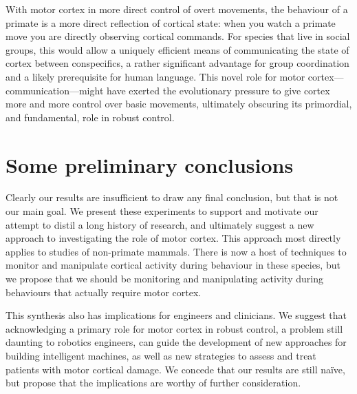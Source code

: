 With motor cortex in more direct control of overt movements, the behaviour of a primate is a more direct reflection of cortical state: when you watch a primate move you are directly observing cortical commands. For species that live in social groups, this would allow a uniquely efficient means of communicating the state of cortex between conspecifics, a rather significant advantage for group coordination and a likely prerequisite for human language. This novel role for motor cortex---communication---might have exerted the evolutionary pressure to give cortex more and more control over basic movements, ultimately obscuring its primordial, and fundamental, role in robust control.

\section{Some preliminary conclusions}

Clearly our results are insufficient to draw any final conclusion, but that is not our main goal. We present these experiments to support and motivate our attempt to distil a long history of research, and ultimately suggest a new approach to investigating the role of motor cortex. This approach most directly applies to studies of non-primate mammals. There is now a host of techniques to monitor and manipulate cortical activity during behaviour in these species, but we propose that we should be monitoring and manipulating activity during behaviours that actually require motor cortex.

This synthesis also has implications for engineers and clinicians. We suggest that acknowledging a primary role for motor cortex in robust control, a problem still daunting to robotics engineers, can guide the development of new approaches for building intelligent machines, as well as new strategies to assess and treat patients with motor cortical damage. We concede that our results are still naïve, but propose that the implications are worthy of further consideration.

